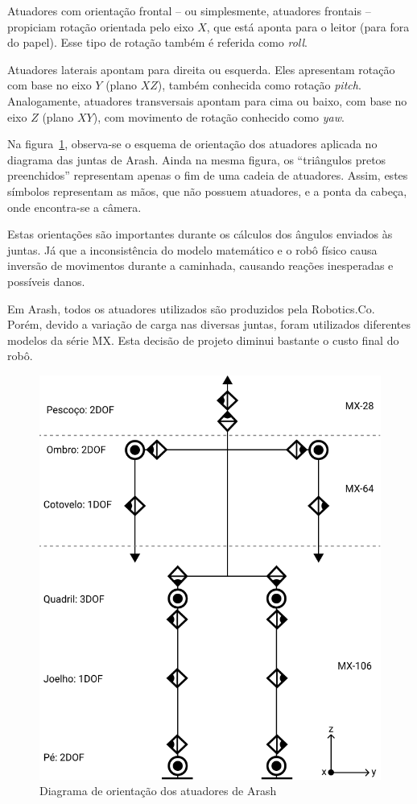 Atuadores com orientação frontal -- ou simplesmente, atuadores frontais -- propiciam rotação orientada pelo eixo $X$, que está aponta para o leitor (para fora do papel). Esse tipo de rotação também é referida como \textit{roll}.

Atuadores laterais apontam para direita ou esquerda. Eles apresentam rotação com base no eixo $Y$ (plano $XZ$), também conhecida como rotação \textit{pitch}. Analogamente, atuadores transversais apontam para cima ou baixo, com base no eixo $Z$ (plano $XY$), com movimento de rotação conhecido como \textit{yaw}.

Na figura~\ref{fig:architecture:arash:actuators_orientations}, observa-se o esquema de orientação dos atuadores aplicada no diagrama das juntas de Arash. Ainda na mesma figura, os ``triângulos pretos preenchidos'' representam apenas o fim de uma cadeia de atuadores. Assim, estes símbolos representam as mãos, que não possuem atuadores, e a ponta da cabeça, onde encontra-se a câmera. 

Estas orientações são importantes durante os cálculos dos ângulos enviados às juntas. Já que a inconsistência do modelo matemático e o robô físico causa inversão de movimentos durante a caminhada, causando reações inesperadas e possíveis danos.

Em Arash, todos os atuadores utilizados são produzidos pela Robotics.Co. Porém, devido a variação de carga nas diversas juntas, foram utilizados diferentes  modelos da série MX. Esta decisão de projeto diminui bastante o custo final do robô.

\begin{figure}[htb]
	\centering
	\includegraphics[scale=1]{imagens/svg/arash-schematics}
	\caption{Diagrama de orientação dos atuadores de Arash}
	\label{fig:architecture:arash:actuators_orientations}
\end{figure}

